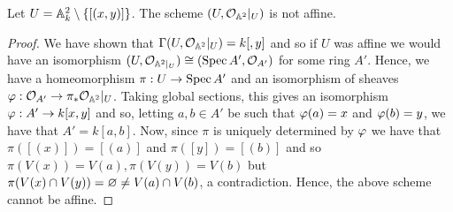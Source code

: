 
\begin{proposition}
    Let $U = \mathbb{A}^2_k \setminus \{[(x,y)]\}$. The scheme $(U, \mathcal{O}_{\mathbb{A}^2}|_U)$ is not affine. 
\end{proposition}

\begin{proof}
    We have shown that $\Gamma(U, \mathcal{O}_{\mathbb{A}^2}|_{U}) = k[,y]$ and so if $U$ was affine we would have an isomorphism $(U, \mathcal{O}_{\mathbb{A}^2|_{U}}) \cong ( \operatorname{Spec} A', \mathcal{O}_{A'})$ for some ring $A'$. Hence, we have a homeomorphism $\pi: U \to \operatorname{Spec} A'$ and an isomorphism of sheaves $\varphi: \mathcal{O}_{A'} \to \pi_* \mathcal{O}_{\mathbb{A}^2}|_U$. Taking global sections, this gives an isomorphism $\varphi: A' \to k[x,y]$ and so, letting $a, b \in A'$ be such that $\varphi(a)=x$ and $\varphi(b)=y$, we have that $A' =k[a,b]$. Now, since $\pi$ is uniquely determined by $\varphi$ we have that $\pi([(x)]) = [(a)]$ and $\pi([y])= [(b)]$ and so $\pi(V(x)) = V(a), \pi(V(y))=V(b)$ but $\pi( V(x) \cap V(y)) = \varnothing \neq V(a) \cap V(b)$, a contradiction. Hence, the above scheme cannot be affine. 
\end{proof}